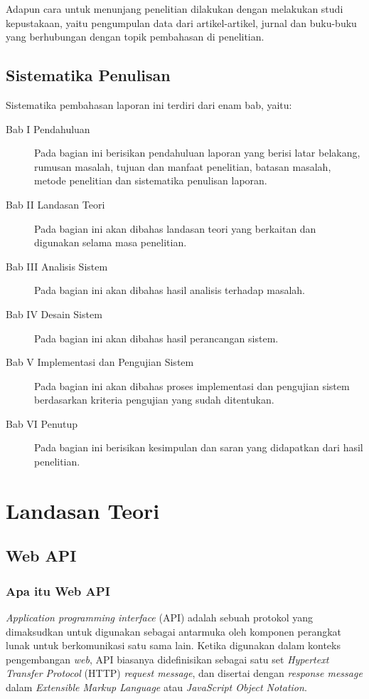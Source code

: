 \documentclass[a4paper, 12pt, oneside]{report}
\begin{document}
\onehalfspacing Adapun cara untuk menunjang penelitian dilakukan dengan melakukan studi kepustakaan, yaitu pengumpulan data dari artikel-artikel, jurnal dan buku-buku yang berhubungan dengan topik pembahasan di penelitian.

\section{Sistematika Penulisan}
Sistematika pembahasan laporan ini terdiri dari enam bab, yaitu:
\begin{description}
  \item[Bab I Pendahuluan] Pada bagian ini berisikan pendahuluan laporan yang berisi latar belakang, rumusan masalah, tujuan dan manfaat penelitian, batasan masalah, metode penelitian dan sistematika penulisan laporan.
  \item[Bab II Landasan Teori] Pada bagian ini akan dibahas landasan teori yang berkaitan dan digunakan selama masa penelitian.
  \item[Bab III Analisis Sistem] Pada bagian ini akan dibahas hasil analisis terhadap masalah.
  \item[Bab IV Desain Sistem] Pada bagian ini akan dibahas hasil perancangan sistem.
  \item[Bab V Implementasi dan Pengujian Sistem] Pada bagian ini akan dibahas proses implementasi dan pengujian sistem berdasarkan kriteria pengujian yang sudah ditentukan.
  \item[Bab VI Penutup] Pada bagian ini berisikan kesimpulan dan saran yang didapatkan dari hasil penelitian.
\end{description}

\chapter{Landasan Teori}

\section{Web API}
\onehalfspacing
\subsection{Apa itu Web API}

\onehalfspacing \textit{Application programming interface} (API) adalah sebuah protokol yang dimaksudkan untuk digunakan sebagai antarmuka oleh komponen perangkat lunak untuk berkomunikasi satu sama lain. Ketika digunakan dalam konteks pengembangan \textit{web}, API biasanya didefinisikan sebagai satu set \textit{Hypertext Transfer Protocol} (HTTP) \textit{request message}, dan disertai dengan \textit{response message} dalam \textit{Extensible Markup Language} atau \textit{JavaScript Object Notation}.
\end{document}
